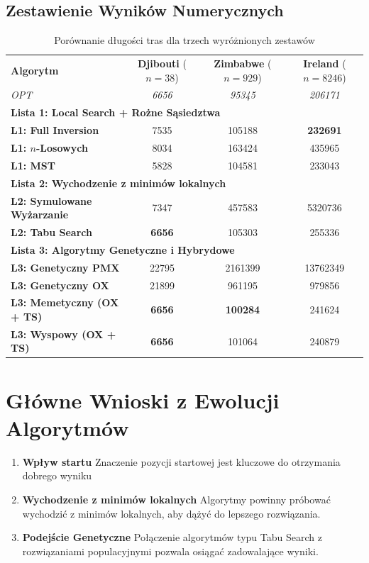 \subsection{Zestawienie Wyników Numerycznych}

\begin{table}[htbp]
\centering
\caption{Porównanie długości tras dla trzech wyróżnionych zestawów}
\small
\begin{tabularx}{\textwidth}{X c c c}
\toprule
\textbf{Algorytm} & \textbf{Djibouti} ($n=38$) & \textbf{Zimbabwe} ($n=929$) & \textbf{Ireland} ($n=8246$) \\ 
\textit{OPT} & \textit{6656} & \textit{95345} & \textit{206171} \\ \midrule
\multicolumn{3}{l}{\textbf{Lista 1: Local Search + Rożne Sąsiedztwa}} \\ \midrule
\textbf{L1: Full Inversion} & 7535 & 105188 & \textbf{232691} \\
\textbf{L1: $n$-Losowych} & 8034 & 163424 & 435965 \\
\textbf{L1: MST} & 5828 & 104581 & 233043 \\ \midrule
\multicolumn{3}{l}{\textbf{Lista 2: Wychodzenie z minimów lokalnych}} \\ \midrule
\textbf{L2: Symulowane Wyżarzanie} & 7347 & 457583 & 5320736 \\ 
\textbf{L2: Tabu Search} & \textbf{6656} & 105303 & 255336 \\ \midrule
\multicolumn{3}{l}{\textbf{Lista 3: Algorytmy Genetyczne i Hybrydowe}} \\ \midrule
\textbf{L3: Genetyczny PMX} & 22795 & 2161399 & 13762349 \\
\textbf{L3: Genetyczny OX} & 21899 & 961195 & 979856 \\
\textbf{L3: Memetyczny (OX + TS)} & \textbf{6656} & \textbf{100284} & 241624 \\
\textbf{L3: Wyspowy (OX + TS)}  & \textbf{6656} & 101064 & 240879 \\
\end{tabularx}
\end{table}

\section{Główne Wnioski z Ewolucji Algorytmów}

\begin{enumerate}
    \item \textbf{Wpływ startu} Znaczenie pozycji startowej jest kluczowe do otrzymania dobrego wyniku  
    \item \textbf{Wychodzenie z minimów lokalnych} Algorytmy powinny próbować wychodzić z minimów lokalnych, aby dążyć do lepszego rozwiązania.
    \item \textbf{Podejście Genetyczne} Połączenie algorytmów typu Tabu Search z rozwiązaniami populacyjnymi pozwala osiągać zadowalające wyniki.
\end{enumerate}